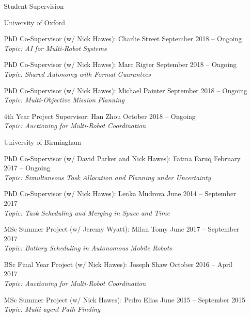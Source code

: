 
\begin{rSection}{Student Supervision}

\begin{rSubsection}{University of Oxford}{}{}{}
\item PhD Co-Supervisor (w/ Nick Hawes): Charlie Street \hfill September 2018 -- Ongoing\\
\textit{Topic: AI for Multi-Robot Systems}

\item PhD Co-Supervisor (w/ Nick Hawes): Marc Rigter \hfill September 2018 -- Ongoing\\
\textit{Topic: Shared Autonomy with Formal Guarantees}

\item PhD Co-Supervisor (w/ Nick Hawes): Michael Painter \hfill September 2018 -- Ongoing\\
\textit{Topic: Multi-Objective Mission Planning}

\item 4th Year Project Supervisor: Han Zhou \hfill October 2018 -- Ongoing\\
\textit{Topic: Auctioning for Multi-Robot Coordination}
\end{rSubsection}

\begin{rSubsection}{University of Birmingham}{}{}{}
\item PhD Co-Supervisor (w/ David Parker and Nick Hawes): Fatma Faruq \hfill February 2017 -- Ongoing\\
\textit{Topic: Simultaneous Task Allocation and Planning under Uncertainty}

\item PhD Co-Supervisor (w/ Nick Hawes):  Lenka Mudrova \hfill June 2014 -- September 2017\\
\textit{Topic: Task Scheduling and Merging in Space and Time}

\item MSc Summer Project (w/ Jeremy Wyatt): Milan Tomy \hfill June 2017 -- September 2017\\
\textit{Topic: Battery Scheduling in Autonomous Mobile Robots}

\item BSc Final Year Project (w/ Nick Hawes): Joseph Shaw \hfill October 2016 -- April 2017\\
\textit{Topic: Auctioning for Multi-Robot Coordination}

\item MSc Summer Project (w/ Nick Hawes): Pedro Elias \hfill June 2015 -- September 2015\\
\textit{Topic: Multi-agent Path Finding}


\end{rSubsection}
\end{rSection}
